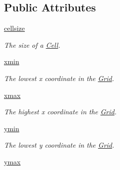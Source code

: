 \subsection*{\-Public \-Attributes}
\begin{DoxyCompactItemize}
\item 
\hypertarget{classSpace_1_1Grid_a21cc181ea0758628f05da0a50973e0f5}{\hyperlink{classSpace_1_1Grid_a21cc181ea0758628f05da0a50973e0f5}{cellsize}}\label{classSpace_1_1Grid_a21cc181ea0758628f05da0a50973e0f5}

\begin{DoxyCompactList}\small\item\em \-The size of a \hyperlink{classSpace_1_1Cell}{\-Cell}. \end{DoxyCompactList}\item 
\hypertarget{classSpace_1_1Grid_ae6a363d5382a6fa9cb19546258cac83e}{\hyperlink{classSpace_1_1Grid_ae6a363d5382a6fa9cb19546258cac83e}{xmin}}\label{classSpace_1_1Grid_ae6a363d5382a6fa9cb19546258cac83e}

\begin{DoxyCompactList}\small\item\em \-The lowest x coordinate in the \hyperlink{classSpace_1_1Grid}{\-Grid}. \end{DoxyCompactList}\item 
\hypertarget{classSpace_1_1Grid_a0f85b5d0632ff606114ae9fe552fdfc3}{\hyperlink{classSpace_1_1Grid_a0f85b5d0632ff606114ae9fe552fdfc3}{xmax}}\label{classSpace_1_1Grid_a0f85b5d0632ff606114ae9fe552fdfc3}

\begin{DoxyCompactList}\small\item\em \-The highest x coordinate in the \hyperlink{classSpace_1_1Grid}{\-Grid}. \end{DoxyCompactList}\item 
\hypertarget{classSpace_1_1Grid_aed20bb23c12c7ecd5d5a3d376941dcd1}{\hyperlink{classSpace_1_1Grid_aed20bb23c12c7ecd5d5a3d376941dcd1}{ymin}}\label{classSpace_1_1Grid_aed20bb23c12c7ecd5d5a3d376941dcd1}

\begin{DoxyCompactList}\small\item\em \-The lowest y coordinate in the \hyperlink{classSpace_1_1Grid}{\-Grid}. \end{DoxyCompactList}\item 
\hypertarget{classSpace_1_1Grid_addbdc5dcad4f56619fea0cc860bf3cad}{\hyperlink{classSpace_1_1Grid_addbdc5dcad4f56619fea0cc860bf3cad}{ymax}}\label{classSpace_1_1Grid_addbdc5dcad4f56619fea0cc860bf3cad}


\end{DoxyCompactItemize}
